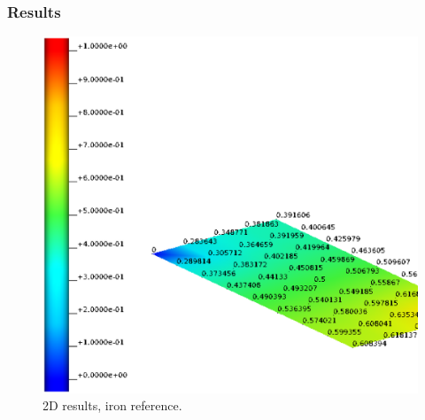\subsubsection{Results}
%
%
%


%
\begin{figure}[h!]
    \centering 
    \includegraphics[width=0.9\columnwidth]{examples/example-0001/doc/figures/iron_reference_2D.eps} 
    \caption{2D results, iron reference.}
    \label{example-0001-iron-2D-reference-fig}
\end{figure}
%
